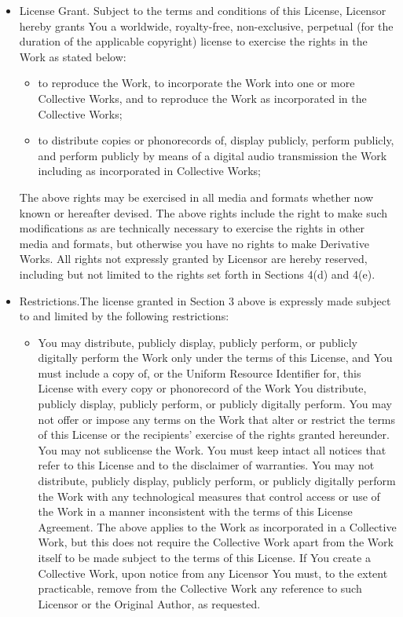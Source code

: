 \documentclass{article}
\begin{document}
\begin{itemize}
\item License Grant.  Subject to the terms and conditions of this
License, Licensor hereby grants You a worldwide, royalty-free,
non-exclusive, perpetual (for the duration of the applicable
copyright) license to exercise the rights in the Work as stated below:

\begin{itemize} \item to reproduce the Work, to incorporate the Work
into one or more Collective Works, and to reproduce the Work as
incorporated in the Collective Works;

\item to distribute copies or phonorecords of, display publicly,
perform publicly, and perform publicly by means of a digital audio
transmission the Work including as incorporated in Collective
Works;\end{itemize}

The above rights may be exercised in all media and formats whether now
known or hereafter devised.  The above rights include the right to
make such modifications as are technically necessary to exercise the
rights in other media and formats, but otherwise you have no rights to
make Derivative Works.  All rights not expressly granted by Licensor
are hereby reserved, including but not limited to the rights set forth
in Sections 4(d) and 4(e).

\item Restrictions.The license granted in Section 3 above is expressly
made subject to and limited by the following restrictions:

\begin{itemize} \item You may distribute, publicly display, publicly
perform, or publicly digitally perform the Work only under the terms
of this License, and You must include a copy of, or the Uniform
Resource Identifier for, this License with every copy or phonorecord
of the Work You distribute, publicly display, publicly perform, or
publicly digitally perform.  You may not offer or impose any terms on
the Work that alter or restrict the terms of this License or the
recipients' exercise of the rights granted hereunder.  You may not
sublicense the Work.  You must keep intact all notices that refer to
this License and to the disclaimer of warranties.  You may not
distribute, publicly display, publicly perform, or publicly digitally
perform the Work with any technological measures that control access
or use of the Work in a manner inconsistent with the terms of this
License Agreement.  The above applies to the Work as incorporated in a
Collective Work, but this does not require the Collective Work apart
from the Work itself to be made subject to the terms of this License. 
If You create a Collective Work, upon notice from any Licensor You
must, to the extent practicable, remove from the Collective Work any
reference to such Licensor or the Original Author, as requested.


\end{itemize}
\end{itemize}
\end{document}
